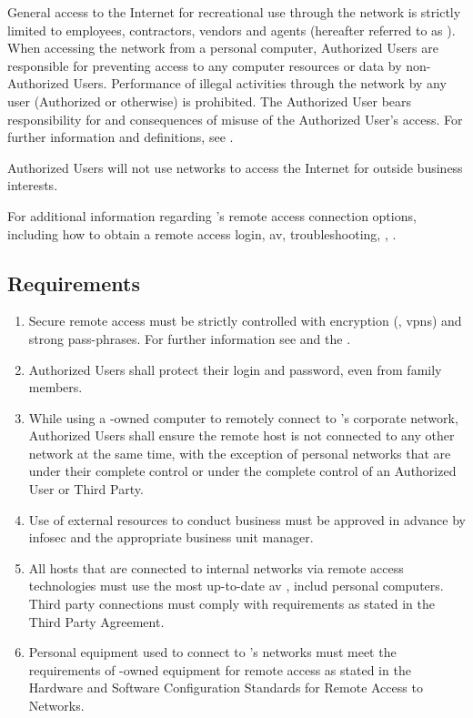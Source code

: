 General access to the Internet for recreational use through the \CompanyName{} network is strictly limited to \CompanyName{} employees, contractors, vendors\oxford{} and agents (hereafter referred to as ).  
When accessing the \CompanyName{} network from a personal computer, Authorized Users are responsible for preventing access to any \CompanyName{} computer resources or data by non-Authorized Users.  
Performance of illegal activities through the \CompanyName{} network by any user (Authorized or otherwise) is prohibited.  
The Authorized User bears responsibility for and consequences of misuse of the Authorized User's access.  
For further information and definitions, see .

Authorized Users will not use \CompanyName{} networks to access the Internet for outside business interests.

For additional information regarding \CompanyName{}'s remote access connection options, including how to obtain a remote access login, \gls{av}, troubleshooting, \etc, . 

\subsection{Requirements}
\begin{enumerate}
\item
Secure remote access must be strictly controlled with encryption (\ie, \gls{vpn}s) and strong pass-phrases.  
For further information see  and the .  
\item
Authorized Users shall protect their login and password, even from family members. 
\item
While using a \CompanyName{}-owned computer to remotely connect to \CompanyName{}'s corporate network, Authorized Users shall ensure the remote host is not connected to any other network at the same time, with the exception of personal networks that are under their complete control or under the complete control of an Authorized User or Third Party. 
\item 
Use of external resources to conduct \CompanyName{} business must be approved in advance by \gls{infosec} and the appropriate business unit manager.
\item 
All hosts that are connected to \CompanyName{} internal networks via remote access technologies must use the most up-to-date \gls{av} ,  includ personal computers.  
Third party connections must comply with requirements as stated in the Third Party Agreement. 
\item
Personal equipment used to connect to \CompanyName{}'s networks must meet the requirements of \CompanyName{}-owned equipment for remote access as stated in the Hardware and Software Configuration Standards for Remote Access to \CompanyName{} Networks. 
\end{enumerate}
